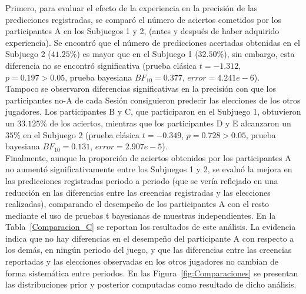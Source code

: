 Primero, para evaluar el efecto de la experiencia en la precisión de las predicciones registradas, se comparó el número de aciertos cometidos por los participantes A en los Subjuegos 1 y 2, (antes y después de haber adquirido experiencia). Se encontró que el número de predicciones acertadas obtenidas en el Subjuego 2 ($41.25\%$) es mayor que en el Subjuego 1 ($32.50\%$), sin embargo, esta diferencia no se encontró significativa (prueba clásica $t = -1.312$, $p = 0.197 > 0.05$, prueba bayesiana $BF_{10} = 0.377$, $error = 4.241e - 6$).\\

Tampoco se observaron diferencias significativas en la precisión con que los participantes no-A de cada Sesión consiguieron predecir las elecciones de los otros jugadores. Los participantes B y C, que participaron en el Subjuego 1, obtuvieron un $33.125\%$ de los aciertos, mientras que los participantes D y E alcanzaron un $35\%$ en el Subjuego 2 (prueba clásica $t = -0.349$, $p = 0.728 > 0.05$, prueba bayesiana $BF_{10} = 0.131$, $error = 2.907e - 5$).\\

Finalmente, aunque la proporción de aciertos obtenidos por los participantes A no aumentó significativamente entre los Subjuegos 1 y 2, se evaluó la mejora en las predicciones registradas periodo a periodo (que se vería reflejado en una reducción en las diferencias entre las creencias registradas y las elecciones realizadas), comparando el desempeño de los participantes A con el resto mediante el uso de pruebas t bayesianas de muestras independientes. En la Tabla~\ref{Comparacion_C} se reportan los resultados de este análisis. La evidencia indica que no hay diferencias en el desempeño del participante A con respecto a los demás, en ningún periodo del juego, y que las diferencias entre las creencias reportadas y las elecciones  observadas en los otros jugadores no cambian de forma sistemática entre periodos. En las Figura~\ref{fig:Comparaciones} se presentan las distribuciones prior y posterior computadas como resultado de dicho análisis.\\

